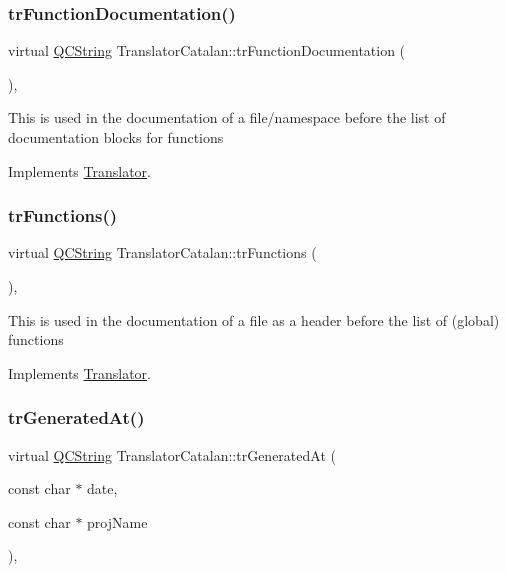 \subsubsection{\texorpdfstring{trFunctionDocumentation()}{trFunctionDocumentation()}}
{\footnotesize\ttfamily virtual \mbox{\hyperlink{class_q_c_string}{Q\+C\+String}} Translator\+Catalan\+::tr\+Function\+Documentation (\begin{DoxyParamCaption}{ }\end{DoxyParamCaption})\hspace{0.3cm}{\ttfamily [inline]}, {\ttfamily [virtual]}}

This is used in the documentation of a file/namespace before the list of documentation blocks for functions 

Implements \mbox{\hyperlink{class_translator}{Translator}}.

\mbox{\label{class_translator_catalan_aa0a7c122b6a924609ca4c54987c4977d}} 
\subsubsection{\texorpdfstring{trFunctions()}{trFunctions()}}
{\footnotesize\ttfamily virtual \mbox{\hyperlink{class_q_c_string}{Q\+C\+String}} Translator\+Catalan\+::tr\+Functions (\begin{DoxyParamCaption}{ }\end{DoxyParamCaption})\hspace{0.3cm}{\ttfamily [inline]}, {\ttfamily [virtual]}}

This is used in the documentation of a file as a header before the list of (global) functions 

Implements \mbox{\hyperlink{class_translator}{Translator}}.

\mbox{\label{class_translator_catalan_a55cc52145215b647cea2e92c1fe95d34}} 
\subsubsection{\texorpdfstring{trGeneratedAt()}{trGeneratedAt()}}
{\footnotesize\ttfamily virtual \mbox{\hyperlink{class_q_c_string}{Q\+C\+String}} Translator\+Catalan\+::tr\+Generated\+At (\begin{DoxyParamCaption}\item[{const char $\ast$}]{date,  }\item[{const char $\ast$}]{proj\+Name }\end{DoxyParamCaption})\hspace{0.3cm}{\ttfamily [inline]}, {\ttfamily [virtual]}}

